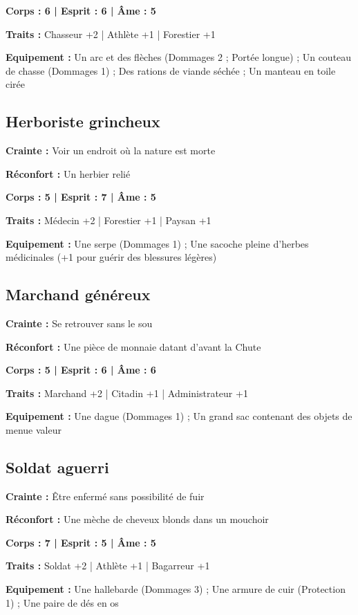 \documentclass[10pt,twoside,twocolumn,openany,bg=print,justified]{dndbook}
\begin{document}
\textbf{Corps : 6 | Esprit : 6 | Âme : 5}

\textbf{Traits :} Chasseur +2 | Athlète +1 | Forestier +1

\textbf{Equipement :} Un arc et des flèches (Dommages 2 ; Portée longue) ; Un couteau de chasse (Dommages 1) ; Des rations de viande séchée ; Un manteau en toile cirée

\subsection*{Herboriste grincheux}

\textbf{Crainte :} Voir un endroit où la nature est morte

\textbf{Réconfort :} Un herbier relié

\textbf{Corps : 5 | Esprit : 7 | Âme : 5}

\textbf{Traits :} Médecin +2 | Forestier +1 | Paysan +1

\textbf{Equipement :} Une serpe (Dommages 1) ; Une sacoche pleine d'herbes médicinales (+1 pour guérir des blessures légères)

\subsection*{Marchand généreux}

\textbf{Crainte :} Se retrouver sans le sou

\textbf{Réconfort :} Une pièce de monnaie datant d'avant la Chute

\textbf{Corps : 5 | Esprit : 6 | Âme : 6}

\textbf{Traits :} Marchand +2 | Citadin +1 | Administrateur +1

\textbf{Equipement :} Une dague (Dommages 1) ; Un grand sac contenant des objets de menue valeur

\subsection*{Soldat aguerri}

\textbf{Crainte :} Être enfermé sans possibilité de fuir

\textbf{Réconfort :} Une mèche de cheveux blonds dans un mouchoir

\textbf{Corps : 7 | Esprit : 5 | Âme : 5}

\textbf{Traits :} Soldat +2 | Athlète +1 | Bagarreur +1

\textbf{Equipement :} Une hallebarde (Dommages 3) ; Une armure de cuir (Protection 1) ; Une paire de dés en os
\end{document}
